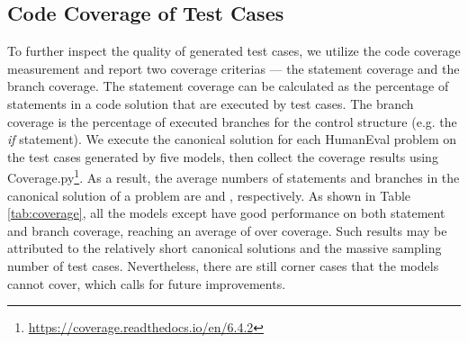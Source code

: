 \subsection{Code Coverage of Test Cases}
\label{appendix_coverage}
To further inspect the quality of generated test cases, we utilize the code coverage measurement and report two coverage criterias --- the statement coverage and the branch coverage. The statement coverage can be calculated as the percentage of statements in a code solution that are executed by test cases. The branch coverage is the percentage of executed branches for the control structure (e.g. the \textit{if} statement). We execute the canonical solution for each HumanEval problem on the test cases generated by five models, then collect the coverage results using Coverage.py\footnote{\url{https://coverage.readthedocs.io/en/6.4.2}}. As a result, the average numbers of statements and branches in the canonical solution of a problem are  and , respectively. As shown in Table \ref{tab:coverage}, all the models except \codegen have good performance on both statement and branch coverage, reaching an average of over  coverage. Such results may be attributed to the relatively short canonical solutions and the massive sampling number of test cases. Nevertheless, there are still corner cases that the models cannot cover, which calls for future improvements.


